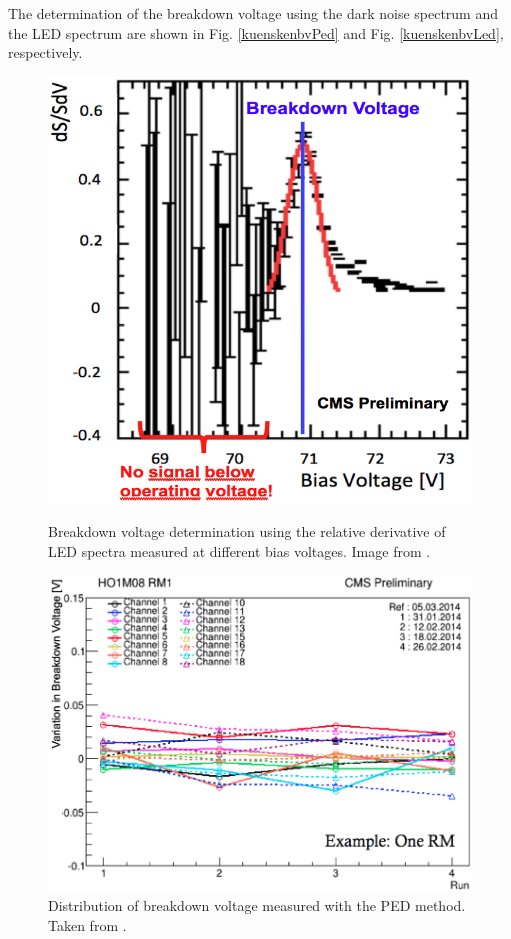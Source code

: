 The determination of the breakdown voltage using the dark noise spectrum and the LED spectrum are shown in Fig. \ref{kuenskenbvPed} and Fig. \ref{kuenskenbvLed}, respectively.
\begin{figure}[htbp]
\centering
\begin{minipage}[htbp]{0.39\textwidth}
\includegraphics[width=\textwidth]{Figures/kuensken/bvLedScaled.png}
\caption{Breakdown voltage determination using the relative derivative of LED spectra measured at different bias voltages. Image from \cite{kuenskenCalor}.}
\label{kuenskenbvLed}
\end{minipage}
\hspace{0.5cm}
\begin{minipage}[htbp]{0.56\textwidth}
\includegraphics[width=\textwidth]{Figures/kuensken/bvOverTime.png}
\caption{Distribution of breakdown voltage measured with the PED method. Taken from \cite{kuenskenCalor}.}
\label{kuenskenbvVsTime}
\end{minipage}
\end{figure}
